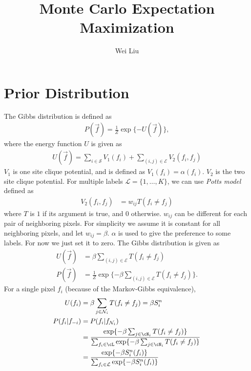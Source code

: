 \documentclass[12pt]{article}
\begin{document}
\title{Monte Carlo Expectation Maximization}
\author{Wei Liu}
\maketitle

\section{Prior Distribution}

The Gibbs distribution is defined as
\begin{align}
  P(\vec f) = \frac{1}{Z} \exp\{-U(\vec f)\},
\end{align}
where the energy function $U$ is given as
\begin{align}
  U(\vec f) = \sum_{i \in \mathcal{S}} V_1 (f_i) + \sum_{(i,j) \in \mathcal{E}} V_2 (f_i, f_j)
\end{align}
$V_1$ is one site clique potential, and is defined as $V_1(f_i) = \alpha(
f_i)$. $V_2$ is the two site clique potential. For multiple labels
$\mathcal{L} = \{1,\dots, K\}$, we can use \emph{Potts model} defined
as
\begin{align}
  V_2 (f_i, f_j) &= w_{ij} T(f_i \neq f_j)
\end{align}
where $T$ is $1$ if its argument is true, and $0$
otherwise\citep{boykov2002fast}. $w_{ij}$ can be different for each
pair of neighboring pixels. For simplicity we assume it is constant
for all neighboring pixels, and let $w_{ij} = \beta$. $\alpha$ is used
to give the preference to some labels. For now we just set it to
zero. The Gibbs distribution is given as
\begin{align}
  U(\vec f) &= \beta \sum_{(i,j) \in \mathcal{E}}T(f_i \neq f_j) \\
  P(\vec f) &= \frac{1}{Z} \exp \{  - \beta \sum_{(i,j) \in \mathcal{E}}T(f_i \neq f_j)\}.
\end{align}
For a single pixel $f_i$ (because of the Markov-Gibbs equivalence),
\begin{align*}
  U(f_i) &= \beta \sum_{j \in \mathcal{N}_i} T(f_i \neq f_j)  = \beta S_i^n\\
  P(f_i | f_{-i} ) &= P(f_i | f_{\mathcal{N}_i}) \\
  &= \frac{\exp\{- \beta \sum_{j\in \cN_i}T(f_i \neq f_j)\}}{\sum_{f_i \in \cL}\exp\{ - \beta \sum_{j\in \cN_i}T(f_i \neq f_j)\}} \\
&=   \frac{\exp \{ -\beta S_i^n(f_i)\}}{\sum_{f_i \in \mathcal{L}} \exp \{ -\beta S_i^n(f_i) \}}
\end{align*}
\end{document}
